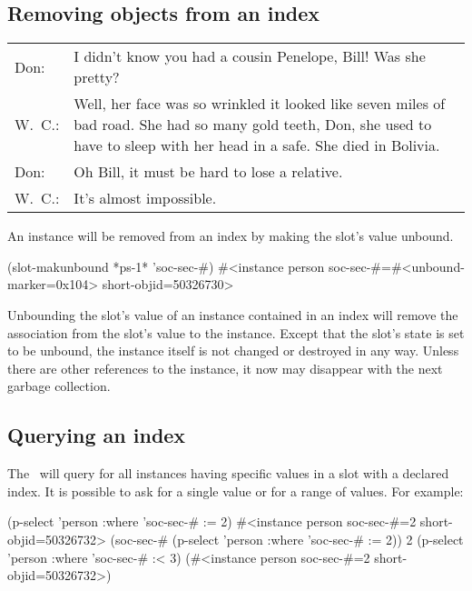 \subsection{Removing objects from an index}
%
\begin{fortune}[11cm]%
\hfill\begin{tabular}{lp{9cm}}
Don:    & I didn't know you had a cousin Penelope, Bill!  Was she
          pretty?\\
W.\ C.: & Well, her face was so wrinkled it looked like seven miles of
          bad road.  She had so many gold teeth, Don, she
          used
          to have to sleep with her head in a safe.
          She died in Bolivia.\\
Don:    & Oh Bill, it must be hard to lose a relative.\\
W.\ C.: & It's almost impossible.
\end{tabular}%
%
\end{fortune}%
\noindent{}An instance will be removed from an index
 by making the slot's value unbound.
\begin{CompactCode}
\listener{}(slot-makunbound *ps-1* 'soc-sec-#)
#<instance person soc-sec-#=#<unbound-marker=0x104> short-objid=50326730>
\end{CompactCode}

Unbounding the slot's value of an instance contained in an index will
remove the association from the slot's value to the instance. Except
that the slot's state is set to be unbound, the instance itself is not
changed or destroyed in any way. Unless there are other references to
the instance, it now may disappear with the next garbage collection.

\subsection{Querying an index}%
\label{sec:IndexQuery}

The \ will query for all instances having specific
values in a slot with a declared index. It is possible to ask for a single value
or for a range of values. For example:
\begin{CompactCode}
\listener{}(p-select 'person :where 'soc-sec-# := 2)
#<instance person soc-sec-#=2 short-objid=50326732>
\listener{}(soc-sec-# (p-select 'person :where 'soc-sec-# := 2))
2
\listener{}(p-select 'person :where 'soc-sec-# :< 3)
(#<instance person soc-sec-#=2 short-objid=50326732>)
\end{CompactCode}


